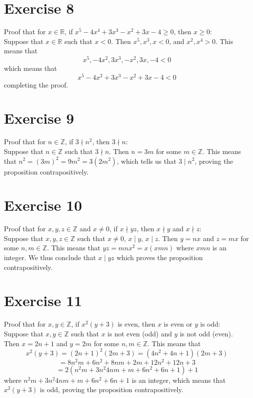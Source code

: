 \documentclass[12pt]{article}
\newcommand{\Z}{\mathbb{Z}}
\newcommand{\R}{\mathbb{R}}
\begin{document}
    \section*{Exercise 8}
    Proof that for $x \in \R$,
    if $x^5 - 4x^4 + 3x^3 - x^2 + 3x - 4 \geqslant 0$,
    then $x \geqslant 0$: \\
    Suppose that $x \in \R$
    such that $x < 0$.
    Then $x^5, x^3, x < 0$,
    and $x^2, x^4 > 0$.
    This means that
    \[ x^5, -4x^2, 3x^3, -x^2, 3x, -4 < 0 \]
    which means that 
    \[ x^5 - 4x^2 + 3x^3 - x^2 + 3x - 4 < 0  \]
    completing the proof. \\

    \section*{Exercise 9}
    Proof that for $n \in \Z$,
    if $3 \nmid n^2$,
    then $3 \nmid n$: \\
    Suppose that $n \in \Z$
    such that $3 \nmid n$.
    Then $n = 3m$ for some $m \in \Z$.
    This means that $n^2 = (3m)^2 = 9m^2 = 3(2m^2)$,
    which tells us that $3 \mid n^2$,
    proving the proposition contrapositively. \\
    
    \section*{Exercise 10}
    Proof that for $x, y, z \in \Z$ and $x \neq 0$,
    if $x \nmid yz$,
    then $x \nmid y$ and $x \nmid z$: \\
    Suppose that  $x, y, z \in \Z$
    such that $x \neq 0$, $x \mid y$, $x \mid z$. 
    Then $y = nx$ and $z = mx$ for some $n, m \in \Z$.
    This means that $yz = mnx^2 = x(xmn)$
    where $xmn$ is an integer.
    We thus conclude that $x \mid yz$
    which proves the proposition contrapositively. \\

    \section*{Exercise 11}
    Proof that for $x, y \in \Z$,
    if $x^2(y+3)$ is even,
    then $x$ is even or $y$ is odd: \\
    Suppose that $x, y \in \Z$
    such that $x$ is not even (odd) and $y$ is not odd (even).
    Then $x = 2n + 1$ and $y = 2m$ for some $n, m \in \Z$.
    This means that
    \[ x^2(y+3) = (2n+1)^2(2m + 3)
    = (4n^2 + 4n + 1)(2m + 3) \]
    \[ = 8n^2m + 6n^2 + 8nm + 2m + 12n^2 + 12n + 3 \]
    \[ = 2(n^2m + 3n^2  4nm + m + 6n^2 + 6n + 1) + 1 \]
    where $n^2m + 3n^2  4nm + m + 6n^2 + 6n + 1$ is an integer,
    which means that $x^2(y+3)$ is odd,
    proving the proposition contrapositively. \\
\end{document}
